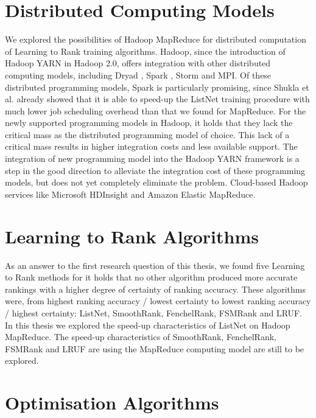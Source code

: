 \section{Distributed Computing Models}
We explored the possibilities of Hadoop MapReduce for distributed computation of Learning to Rank training algorithms. Hadoop, since the introduction of Hadoop YARN in Hadoop 2.0, offers integration with other distributed computing models, including Dryad \cite{Isard2007}, Spark \cite{Zaharia2010}, Storm \cite{Aniello2013} and MPI. Of these distributed programming models, Spark is particularly promising, since Shukla et al. \cite{Shukla2012} already showed that it is able to speed-up the ListNet training procedure with much lower job scheduling overhead than that we found for MapReduce. For the newly supported programming models in Hadoop, it holds that they lack the critical mass as the distributed programming model of choice. This lack of a critical mass results in higher integration costs and less available support. The integration of new programming model into the Hadoop YARN framework is a step in the good direction to alleviate the integration cost of these programming models, but does not yet completely eliminate the problem. Cloud-based Hadoop services like Microsoft HDInsight and Amazon Elastic MapReduce.

\section{Learning to Rank Algorithms}
As an answer to the first research question of this thesis, we found five Learning to Rank methods for it holds that no other algorithm produced more accurate rankings with a higher degree of certainty of ranking accuracy. These algorithms were, from highest ranking accuracy / lowest certainty to lowest ranking accuracy / highest certainty: ListNet, SmoothRank, FenchelRank, FSMRank and LRUF. In this thesis we explored the speed-up characteristics of ListNet on Hadoop MapReduce. The speed-up characteristics of SmoothRank, FenchelRank, FSMRank and LRUF are using the MapReduce computing model are still to be explored.

\section{Optimisation Algorithms}

